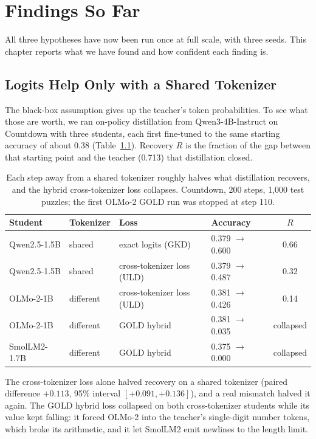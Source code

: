 \chapter{Findings So Far}
\label{ca:chap:findings}

All three hypotheses have now been run once at full scale, with three seeds. This chapter
reports what we have found and how confident each finding is.

\section{Logits Help Only with a Shared Tokenizer}
\label{ca:sec:motivating}

The black-box assumption gives up the teacher's token probabilities. To see what those are
worth, we ran on-policy distillation from Qwen3-4B-Instruct on Countdown with three
students, each first fine-tuned to the same starting accuracy of about 0.38
(Table~\ref{ca:tab:motivating}). Recovery $R$ is the fraction of the gap between that
starting point and the teacher (0.713) that distillation closed.

\begin{table}[htbp]
\centering
\small
\begin{tabular}{@{}llllc@{}}
\toprule
\textbf{Student} & \textbf{Tokenizer} & \textbf{Loss} & \textbf{Accuracy} & $R$ \\
\midrule
Qwen2.5-1.5B & shared    & exact logits (GKD)         & 0.379 $\to$ 0.600 & 0.66 \\
Qwen2.5-1.5B & shared    & cross-tokenizer loss (ULD) & 0.379 $\to$ 0.487 & 0.32 \\
OLMo-2-1B    & different & cross-tokenizer loss (ULD) & 0.381 $\to$ 0.426 & 0.14 \\
OLMo-2-1B    & different & GOLD hybrid                & 0.381 $\to$ 0.035 & collapsed \\
SmolLM2-1.7B & different & GOLD hybrid                & 0.375 $\to$ 0.000 & collapsed \\
\bottomrule
\end{tabular}
\caption{Each step away from a shared tokenizer roughly halves what distillation recovers,
and the hybrid cross-tokenizer loss collapses. Countdown, 200 steps, 1,000 test puzzles;
the first OLMo-2 GOLD run was stopped at step 110.}
\label{ca:tab:motivating}
\end{table}

The cross-tokenizer loss alone halved recovery on a shared tokenizer (paired difference
$+0.113$, 95\% interval $[+0.091, +0.136]$), and a real mismatch halved it again. The GOLD
hybrid loss collapsed on both cross-tokenizer students while its value kept falling: it
forced OLMo-2 into the teacher's single-digit number tokens, which broke its arithmetic, and
it let SmolLM2 emit newlines to the length limit.

